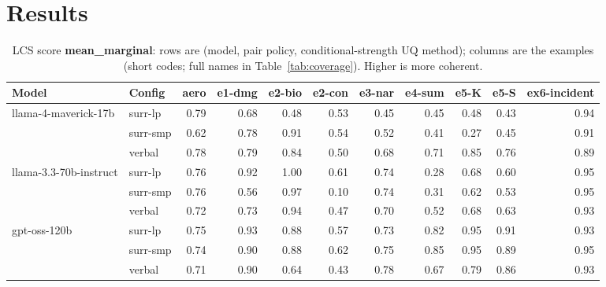 \documentclass[11pt]{article}
\begin{document}
\section{Results}

\begin{table}[htbp]
\centering
\footnotesize
\setlength{\tabcolsep}{3.5pt}
\caption{LCS score \textbf{mean\_marginal}: rows are (model, pair policy, conditional-strength UQ method); columns are the examples (short codes; full names in Table~\ref{tab:coverage}). Higher is more coherent.}
\label{tab:mean-marginal}
\begin{tabular}{llrrrrrrrrr}
\toprule
\textbf{Model} & \textbf{Config} & \textbf{aero} & \textbf{e1-dmg} & \textbf{e2-bio} & \textbf{e2-con} & \textbf{e3-nar} & \textbf{e4-sum} & \textbf{e5-K} & \textbf{e5-S} & \textbf{ex6-incident} \\
\midrule
llama-4-maverick-17b & surr-lp & 0.79 & 0.68 & 0.48 & 0.53 & 0.45 & 0.45 & 0.48 & 0.43 & 0.94 \\
 & surr-smp & 0.62 & 0.78 & 0.91 & 0.54 & 0.52 & 0.41 & 0.27 & 0.45 & 0.91 \\
 & verbal & 0.78 & 0.79 & 0.84 & 0.50 & 0.68 & 0.71 & 0.85 & 0.76 & 0.89 \\
\midrule
llama-3.3-70b-instruct & surr-lp & 0.76 & 0.92 & 1.00 & 0.61 & 0.74 & 0.28 & 0.68 & 0.60 & 0.95 \\
 & surr-smp & 0.76 & 0.56 & 0.97 & 0.10 & 0.74 & 0.31 & 0.62 & 0.53 & 0.95 \\
 & verbal & 0.72 & 0.73 & 0.94 & 0.47 & 0.70 & 0.52 & 0.68 & 0.63 & 0.93 \\
\midrule
gpt-oss-120b & surr-lp & 0.75 & 0.93 & 0.88 & 0.57 & 0.73 & 0.82 & 0.95 & 0.91 & 0.93 \\
 & surr-smp & 0.74 & 0.90 & 0.88 & 0.62 & 0.75 & 0.85 & 0.95 & 0.89 & 0.95 \\
 & verbal & 0.71 & 0.90 & 0.64 & 0.43 & 0.78 & 0.67 & 0.79 & 0.86 & 0.93 \\
\bottomrule
\end{tabular}
\end{table}
\end{document}
